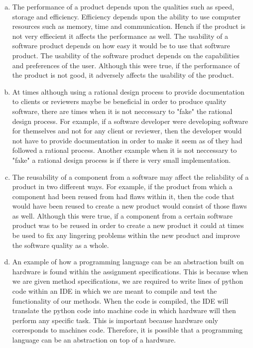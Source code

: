 \documentclass[12pt]{article}
\begin{document}
\begin{enumerate}[(a)]
\item The performance of a product depends upon the qualities such as speed, storage and efficiency. Efficiency depends upon the ability to use computer
resources such as memory, time and communication. Hench if the product is not very effiecient it affects the performance as well. The usability of a
software product depends on how easy it would be to use that software product. The usability of the software product depends on the capabilities and
preferences of the user. Although this were true, if the performance of the product is not good, it adversely affects the usability of the product.

\item At times although using a rational design process to provide documentation to clients or reviewers maybe be beneficial in order to produce quality
software, there are times when it is not neccessary to "fake" the rational design process. For example, if a software developer were developing software for
themselves and not for any client or reviewer, then the developer would not have to provide documentation in order to make it seem as of they had followed a
rational process. Another example when it is not neccessary to "fake" a rational design process is if there is very small implementation.

\item The reusability of a component from a software may affect the reliability of a product in two different ways. For example, if the product from which a
component had been reused from had flaws within it, then the code that would have been reused to create a new product would consist of those flaws as well.
Although this were true, if a component from a certain software product was to be reused in order to create a new product it could at times be used to fix
any lingering problems within the new product and improve the software quality as a whole.

\item An example of how a programming language can be an abstraction built on hardware is found within the assignment specifications. This is because when
we are given method specifications, we are required to write lines of python code within an IDE in which we are meant to compile and test the functionality
of our methods. When the code is compiled, the IDE will translate the python code into machine code in which hardware will then perform any specific task.
This is important because hardware only corresponds to machines code. Therefore, it is possible that a programming language can be an abstraction on top of
a hardware.

\end{enumerate}
\end{document}
